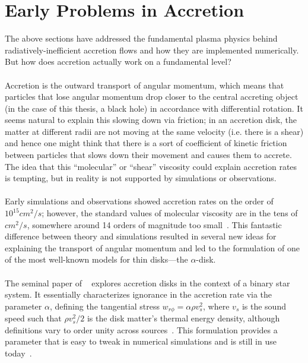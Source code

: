 
\section{Early Problems in Accretion}\label{sec:early}
The above sections have addressed the fundamental plasma physics behind radiatively-inefficient accretion flows and how they are implemented numerically. But how does accretion actually work on a fundamental level? \\
\\
Accretion is the outward transport of angular momentum, which means that particles that lose angular momentum drop closer to the central accreting object (in the case of this thesis, a black hole) in accordance with differential rotation. It seems natural to explain this slowing down via friction; in an accretion disk, the matter at different radii are not moving at the same velocity (i.e. there is a shear) and hence one might think that there is a sort of coefficient of kinetic friction between particles that slows down their movement and causes them to accrete. The idea that this ``molecular'' or ``shear'' viscosity could explain accretion rates is tempting, but in reality is not supported by simulations or observations.\\
\\
Early simulations and observations showed accretion rates on the order of $10^{15}cm^2/s$; however, the standard values of molecular viscosity are in the tens of $cm^2/s$, somewhere around 14 orders of magnitude too small~\cite{Spruit2009}. This fantastic difference between theory and simulations resulted in several new ideas for explaining the transport of angular momentum and led to the formulation of one of the most well-known models for thin disks---the $\alpha$-disk.\\
\\
The seminal paper of ~\citet{SS1973} explores accretion disks in the context of a binary star system. It essentially characterizes ignorance in the accretion rate via the parameter $\alpha$, defining the tangential stress $w_{r\phi}=\alpha\rho v_s^2$, where $v_s$ is the sound speed such that $\rho v_s^2/2$ is the disk matter's thermal energy density, although definitions vary to order unity across sources~\cite{SS1973}. This formulation provides a parameter that is easy to tweak in numerical simulations and is still in use today~\cite{Penna2013}. \\
